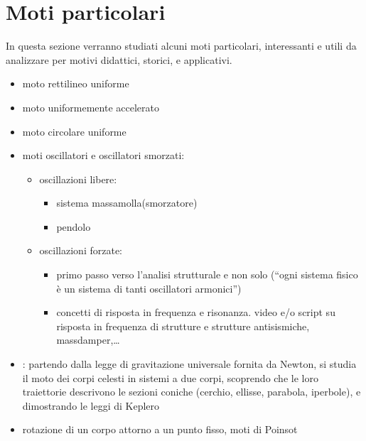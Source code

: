 \documentclass[letterpaper,10pt,english]{jupyterBook}
\begin{document}
\section{Moti particolari}
\label{\detokenize{ch/dynamics-motions:moti-particolari}}\label{\detokenize{ch/dynamics-motions:classical-mechanics-dynamics-motions}}\label{\detokenize{ch/dynamics-motions::doc}}
\sphinxAtStartPar
In questa sezione verranno studiati alcuni moti particolari, interessanti e utili da analizzare per motivi didattici, storici, e applicativi.
\begin{itemize}
\item {} 
\sphinxAtStartPar
moto rettilineo uniforme

\item {} 
\sphinxAtStartPar
moto uniformemente accelerato

\item {} 
\sphinxAtStartPar
moto circolare uniforme

\item {} 
\sphinxAtStartPar
moti oscillatori e oscillatori smorzati:
\begin{itemize}
\item {} 
\sphinxAtStartPar
oscillazioni libere:
\begin{itemize}
\item {} 
\sphinxAtStartPar
sistema massa\sphinxhyphen{}molla(\sphinxhyphen{}smorzatore)

\item {} 
\sphinxAtStartPar
pendolo

\end{itemize}

\item {} 
\sphinxAtStartPar
oscillazioni forzate:
\begin{itemize}
\item {} 
\sphinxAtStartPar
primo passo verso l’analisi strutturale e non solo (“ogni sistema fisico è un sistema di tanti oscillatori armonici”)

\item {} 
\sphinxAtStartPar
concetti di risposta in frequenza e risonanza.  video e/o script su risposta in frequenza di strutture e strutture antisismiche, mass\sphinxhyphen{}damper,…

\end{itemize}

\end{itemize}

\item {} 
\sphinxAtStartPar
{}: partendo dalla legge di gravitazione universale fornita da Newton, si studia il moto dei corpi celesti in sistemi a due corpi, scoprendo che le loro traiettorie descrivono le sezioni coniche (cerchio, ellisse, parabola, iperbole), e dimostrando le leggi di Keplero

\item {} 
\sphinxAtStartPar
rotazione di un corpo attorno a un punto fisso, moti di Poinsot

\end{itemize}
\end{document}
